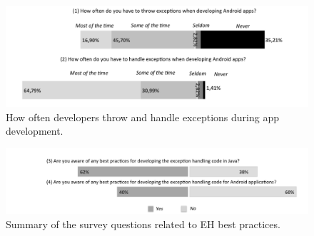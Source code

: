 \begin{figure} \centering \includegraphics[scale=0.58]{agree_new2.png}
\caption{How often developers throw and handle exceptions during app development.}
\label{fig:often}
\end{figure}


\begin{figure} \centering \includegraphics[scale=0.60]{yes_no_best_new.png}
\caption{Summary of the survey questions related to EH best practices. }
\label{fig:allquest}
\end{figure}


